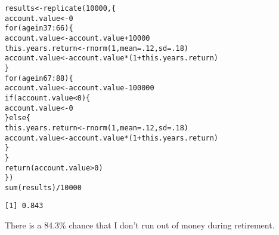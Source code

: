 \documentclass{beamer}\usepackage[]{graphicx}\usepackage[]{color}
\makeatletter
\newcommand{\hlnum}[1]{\textcolor[rgb]{0.824,0.412,0.118}{#1}}%
\newcommand{\hlopt}[1]{\textcolor[rgb]{1,0.894,0.769}{#1}}%
\newcommand{\hlstd}[1]{\textcolor[rgb]{1,0.894,0.769}{#1}}%
\newcommand{\hlkwa}[1]{\textcolor[rgb]{0.941,0.902,0.549}{#1}}%
\newcommand{\hlkwb}[1]{\textcolor[rgb]{0.804,0.776,0.451}{#1}}%
\newcommand{\hlkwc}[1]{\textcolor[rgb]{0.78,0.941,0.545}{#1}}%
\newcommand{\hlkwd}[1]{\textcolor[rgb]{1,0.78,0.769}{#1}}%
\newenvironment{kframe}{%
 \def\at@end@of@kframe{}%
 \ifinner\ifhmode%
  \def\at@end@of@kframe{\end{minipage}}%
  \begin{minipage}{\columnwidth}%
 \fi\fi%
 \def\FrameCommand##1{\hskip\@totalleftmargin \hskip-\fboxsep
 \colorbox{shadecolor}{##1}\hskip-\fboxsep
     \hskip-\linewidth \hskip-\@totalleftmargin \hskip\columnwidth}%
 \MakeFramed {\advance\hsize-\width
   \@totalleftmargin\z@ \linewidth\hsize
   \@setminipage}}%
 {\par\unskip\endMakeFramed%
 \at@end@of@kframe}
\newenvironment{knitrout}{}{} %
\makeatother
\begin{document}
\begin{darkframes}
    \begin{frame}[fragile]
      \fontvsm
\begin{knitrout}
\begin{kframe}
\begin{alltt}
\hlstd{results} \hlkwb{<-} \hlkwd{replicate}\hlstd{(}\hlnum{10000}\hlstd{, \{}
  \hlstd{account.value} \hlkwb{<-} \hlnum{0}
  \hlkwa{for} \hlstd{(age} \hlkwa{in} \hlnum{37}\hlopt{:}\hlnum{66}\hlstd{) \{}
    \hlstd{account.value} \hlkwb{<-} \hlstd{account.value} \hlopt{+} \hlnum{10000}
    \hlstd{this.years.return} \hlkwb{<-} \hlkwd{rnorm}\hlstd{(}\hlnum{1}\hlstd{,} \hlkwc{mean}\hlstd{=}\hlnum{.12}\hlstd{,} \hlkwc{sd}\hlstd{=}\hlnum{.18}\hlstd{)}
    \hlstd{account.value} \hlkwb{<-} \hlstd{account.value} \hlopt{*} \hlstd{(}\hlnum{1} \hlopt{+} \hlstd{this.years.return)}
  \hlstd{\}}
  \hlkwa{for} \hlstd{(age} \hlkwa{in} \hlnum{67}\hlopt{:}\hlnum{88}\hlstd{) \{}
    \hlstd{account.value} \hlkwb{<-} \hlstd{account.value} \hlopt{-} \hlnum{100000}
    \hlkwa{if} \hlstd{(account.value} \hlopt{<} \hlnum{0}\hlstd{) \{}
      \hlstd{account.value} \hlkwb{<-} \hlnum{0}
    \hlstd{\}} \hlkwa{else} \hlstd{\{}
      \hlstd{this.years.return} \hlkwb{<-} \hlkwd{rnorm}\hlstd{(}\hlnum{1}\hlstd{,} \hlkwc{mean}\hlstd{=}\hlnum{.12}\hlstd{,} \hlkwc{sd}\hlstd{=}\hlnum{.18}\hlstd{)}
      \hlstd{account.value} \hlkwb{<-} \hlstd{account.value} \hlopt{*} \hlstd{(}\hlnum{1} \hlopt{+} \hlstd{this.years.return)}
    \hlstd{\}}
  \hlstd{\}}
  \hlkwd{return}\hlstd{(account.value} \hlopt{>} \hlnum{0}\hlstd{)}
\hlstd{\})}
\hlkwd{sum}\hlstd{(results)} \hlopt{/} \hlnum{10000}
\end{alltt}
\begin{verbatim}
[1] 0.843
\end{verbatim}
\end{kframe}
\end{knitrout}
      \pause
      There is a 84.3\% chance that I don't run out of money during retirement.
    \end{frame}
  \end{darkframes}
\end{document}
